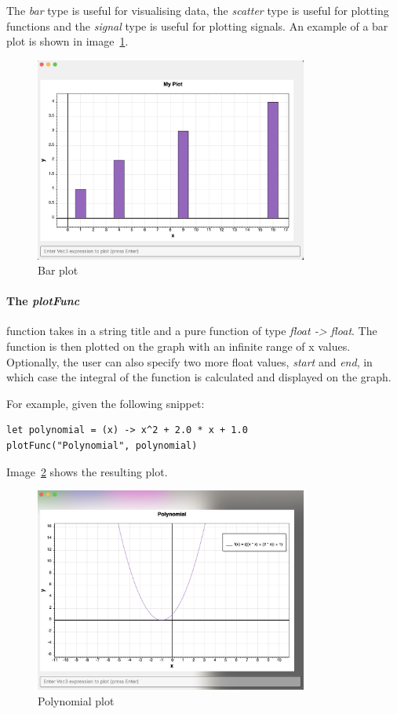 The \textit{bar} type is useful for visualising data, the \textit{scatter} type is useful for plotting functions and
the \textit{signal} type is useful for plotting signals.
An example of a bar plot is shown in image~\ref{fig:bar-plot}.

\begin{figure}[H]
    \centering
    \includegraphics[width=0.8\textwidth]{assets/barChart}
    \caption{Bar plot}\label{fig:bar-plot}
\end{figure}

\paragraph{The \textit{plotFunc}} function takes in a string title and a pure function of type \textit{float -> float}.
The function is then plotted on the graph with an infinite range of x values.
Optionally, the user can also specify two more float values, \textit{start} and \textit{end}, in which case the 
integral of the function is calculated and displayed on the graph.

For example, given the following snippet:

\begin{verbatim}
let polynomial = (x) -> x^2 + 2.0 * x + 1.0
plotFunc("Polynomial", polynomial)
\end{verbatim}

Image~\ref{fig:polynomial-plot} shows the resulting plot.

\begin{figure}[H]
    \centering
    \includegraphics[width=0.8\textwidth]{assets/polynomialPlot}
    \caption{Polynomial plot}\label{fig:polynomial-plot}
\end{figure}

